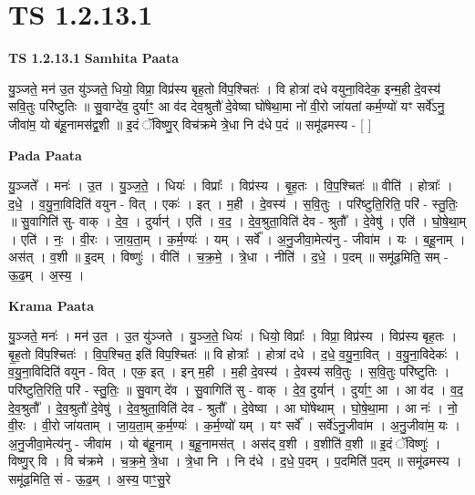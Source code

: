 \documentclass[17pt]{extarticle}
\begin{document}
\section{ TS 1.2.13.1 }

\textbf{TS 1.2.13.1 } \newline
\textbf{Samhita Paata} \newline

यु॒ञ्जते॒ मन॑ उ॒त यु॑ञ्जते॒ धियो॒ विप्रा॒ विप्र॑स्य बृह॒तो वि॑प॒श्चितः॑ । वि होत्रा॑ दधे वयुना॒विदेक॒ इन्म॒ही दे॒वस्य॑ सवि॒तुः परि॑ष्टुतिः ॥ सु॒वाग्दे॑व॒ दुर्याꣳ॒॒ आ व॑द देव॒श्रुतौ॑ दे॒वेष्वा घो॑षेथा॒मा नो॑ वी॒रो जा॑यतां कर्म॒ण्यो॑ यꣳ सर्वे॑ऽनु॒ जीवा॑म॒ यो ब॑हू॒नामस॑द्व॒शी ॥ इ॒दं ॅविष्णु॒र् विच॑क्रमे त्रे॒धा नि द॑धे प॒दं ॥ समू॑ढमस्य - [ ] \newline

\textbf{Pada Paata} \newline

यु॒ञ्जते᳚ । मनः॑ । उ॒त । यु॒ञ्ज॒ते॒ । धियः॑ । विप्राः᳚ । विप्र॑स्य । बृ॒ह॒तः । वि॒प॒श्चितः॑ ॥ वीति॑ । होत्राः᳚ । द॒धे॒ । व॒यु॒ना॒विदिति॑ वयुन - वित् । एकः॑ । इत् । म॒ही । दे॒वस्य॑ । स॒वि॒तुः । परि॑ष्टुति॒रिति॒ परि॑ - स्तु॒तिः॒ ॥ सु॒वागिति॑ सु- वाक् । दे॒व॒ । दुर्यान्॑ । एति॑ । व॒द॒ । दे॒व॒श्रुता॒विति॑ देव - श्रुतौ᳚ । दे॒वेषु॑ । एति॑ । घो॒षे॒था॒म् । एति॑ । नः॒ । वी॒रः । जा॒य॒ता॒म् । क॒र्म॒ण्यः॑ । यम् । सर्वे᳚ । अ॒नु॒जीवा॒मेत्य॑नु - जीवा॑म । यः । ब॒हू॒नाम् । अस॑त् । व॒शी ॥ इ॒दम् । विष्णुः॑ । वीति॑ । च॒क्र॒मे॒ । त्रे॒धा । नीति॑ । द॒धे॒ । प॒दम् ॥ समू॑ढ॒मिति॒ सम् - ऊ॒ढ॒म् । अ॒स्य॒ ।  \newline


\textbf{Krama Paata} \newline

यु॒ञ्जते॒ मनः॑ । मन॑ उ॒त । उ॒त यु॑ञ्जते । यु॒ञ्ज॒ते॒ धियः॑ । धियो॒ विप्राः᳚ । विप्रा॒ विप्र॑स्य । विप्र॑स्य बृह॒तः । बृ॒ह॒तो वि॑प॒श्चितः॑ । वि॒प॒श्चित॒ इति॑ विप॒श्चितः॑ ॥ वि होत्राः᳚ । होत्रा॑ दधे । द॒धे॒ व॒यु॒ना॒वित् । व॒यु॒ना॒विदेकः॑ । व॒यु॒ना॒विदिति॑ वयुन - वित् । एक॒ इत् । इन् म॒ही । म॒ही दे॒वस्य॑ । दे॒वस्य॑ सवि॒तुः । स॒वि॒तुः परि॑ष्टुतिः । परि॑ष्टुति॒रिति॒ परि॑ - स्तु॒तिः॒ ॥ सु॒वाग् दे॑व । सु॒वागिति॑ सु - वाक् । दे॒व॒ दुर्यान्॑ । दुर्याꣳ॒॒ आ । आ व॑द । व॒द॒ दे॒व॒श्रुतौ᳚ । दे॒व॒श्रुतौ॑ दे॒वेषु॑ । दे॒व॒श्रुता॒विति॑ देव - श्रुतौ᳚ । दे॒वेष्वा । आ घो॑षेथाम् । घो॒षे॒था॒मा । आ नः॑ । नो॒ वी॒रः । वी॒रो जा॑यताम् । जा॒य॒ता॒म् क॒र्म॒ण्यः॑ । क॒र्म॒ण्यो॑ यम् । यꣳ सर्वे᳚ । सर्वे॑ऽनु॒जीवा॑म । अ॒नु॒जीवा॑म॒ यः । अ॒नु॒जीवा॒मेत्य॑नु - जीवा॑म । यो ब॑हू॒नाम् । ब॒हू॒नामस॑त् । अस॑द् व॒शी । व॒शीति॑ व॒शी ॥ इ॒दं ॅविष्णुः॑ । विष्णु॒र् वि । वि च॑क्रमे । च॒क्र॒मे॒ त्रे॒धा । त्रे॒धा नि । नि द॑धे । द॒धे॒ प॒दम् । प॒दमिति॑ प॒दम् ॥ समू॑ढमस्य । समू॑ढ॒मिति॒ सं - ऊ॒ढ॒म् । अ॒स्य॒ पाꣳ॒॒सु॒रे \newline
\end{document}
